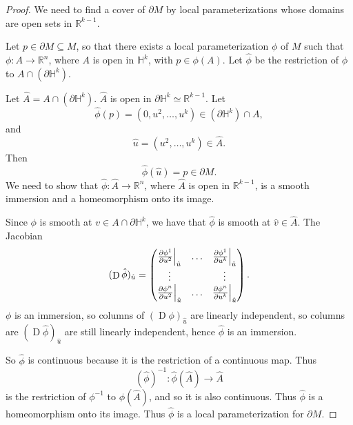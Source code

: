 \documentclass[notoc,notitlepage]{tufte-book}
\DeclareMathOperator{\D}{D}
\begin{document}
\begin{proof}
  We need to find a cover of $\partial M$ by local parameterizations whose
  domains are open sets in $\mathbb{R}^{k-1}$.

  Let  $p \in \partial M \subseteq M$, so that there exists a local
  parameterization $\phi$ of $M$ such that $\phi : A \to \mathbb{R}^n$, where $A$ 
  is open in $\mathbb{H}^k$, with $p \in \phi(A)$. Let $\hat{\phi}$ be the
  restriction of $\phi$ to $A \cap (\partial \mathbb{H}^k)$.

  Let $\hat{A} = A \cap (\partial \mathbb{H}^k)$.  $\hat{A}$ is
  open in $\partial \mathbb{H}^k \simeq \mathbb{R}^{k-1}$. Let
  \begin{equation*}
    \hat{\phi}(p) = (0, u^2, \ldots, u^k) \in (\partial \mathbb{H}^k) \cap A,
  \end{equation*}
  and
  \begin{equation*}
    \hat{u} = (u^2, \ldots, u^k) \in \hat{A}.
  \end{equation*}
  Then
  \begin{equation*}
    \hat{\phi}(\hat{u}) = p \in \partial M.
  \end{equation*}
  We need to show that $\hat{\phi} : \hat{A} \to \mathbb{R}^n$, where $\hat{A}$ 
  is open in $\mathbb{R}^{k-1}$, is a smooth immersion and a homeomorphism onto
  its image.

  Since $\phi$ is smooth at $v \in A \cap \partial \mathbb{H}^k$, we have that
  $\hat{\phi}$ is smooth at $\hat{v} \in \hat{A}$. The Jacobian
  \begin{equation*}
    (\D \hat{\phi})_{\hat{u}} = \begin{pmatrix}
      \frac{\partial \phi^1}{\partial u^2} \at{\hat{u}}{} & \hdots &
      \frac{\partial \phi^1}{\partial u^k}
      \at{\hat{u}}{} \\
      \vdots & & \vdots \\
      \frac{\partial \phi^n}{\partial u^2} \at{\hat{u}}{} & \hdots & \frac{\partial \phi^n}{\partial u^k} \at{\hat{u}}{}
    \end{pmatrix}.
  \end{equation*}
  $\phi$ is an immersion, so columns of $(\D \phi)_{\hat{u}}$ are linearly
  independent, so columns are $(\D \hat{\phi})_{\hat{u}}$ are still linearly
  independent, hence $\hat{\phi}$ is an immersion.

  So $\hat{\phi}$ is continuous because it is the restriction of a continuous
  map. Thus
  \begin{equation*}
    (\hat{\phi})^{-1} : \hat{\phi}(\hat{A}) \to \hat{A}
  \end{equation*}
  is the restriction of $\phi^{-1}$ to $\phi(\hat{A})$, and so it is also
  continuous. Thus $\hat{\phi}$ is a homeomorphism onto its image. Thus
  $\hat{\phi}$ is a local parameterization for $\partial M$.
\end{proof}
\end{document}

